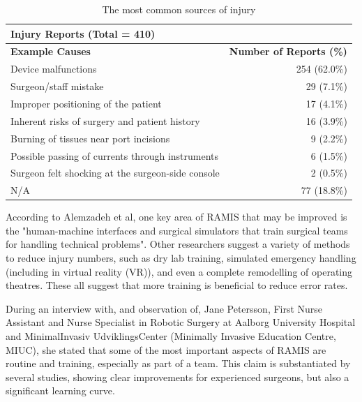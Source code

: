 \documentclass[conference]{IEEEtran}
\begin{document}
\begin{table}
\centering
\begin{tabular}{@{}lr@{}}
\toprule
\multicolumn{2}{l}{\textbf{Injury Reports (Total = 410)}}                           \\ \midrule
\textbf{Example Causes}                           & \textbf{Number of Reports (\%)} \\ \midrule
Device malfunctions                               & 254 (62.0\%)                    \\
Surgeon/staff mistake                             & 29 (7.1\%)                      \\
Improper positioning of the patient               & 17 (4.1\%)                      \\
Inherent risks of surgery and patient history     & 16 (3.9\%)                      \\
Burning of tissues near port incisions            & 9 (2.2\%)                       \\
Possible passing of currents through instruments           & 6 (1.5\%)                       \\
Surgeon felt shocking at the surgeon-side console & 2 (0.5\%)                       \\
N/A                                               & 77 (18.8\%)                     \\ \toprule
\end{tabular}
\caption{The most common sources of injury\citep{alemzadeh_adverse_2016}}
\label{tab:Alam}
\end{table}

According to Alemzadeh et al, one key area of RAMIS that may be improved is the "human-machine interfaces and surgical simulators that train surgical teams for handling technical problems". Other researchers suggest a variety of methods to reduce injury numbers, such as dry lab training, simulated emergency handling (including in virtual reality (VR)), and even a complete remodelling of operating theatres\citep{liberman_training_2011, huser_simulated_2014, ahmad_ambulatory_2016, abelson_virtual_2015}. These all suggest that more training is beneficial to reduce error rates.

During an interview with, and observation of, Jane Petersson, First Nurse Assistant and Nurse Specialist in Robotic Surgery at Aalborg University Hospital and MinimalInvasiv UdviklingsCenter (Minimally Invasive Education Centre, MIUC), she stated that some of the most important aspects of RAMIS are routine and training, especially as part of a team. This claim is substantiated by several studies, showing clear improvements for experienced surgeons, but also a significant learning curve\citep{moorthy_human_2005,chandra_comparison_2010}.
\end{document}
